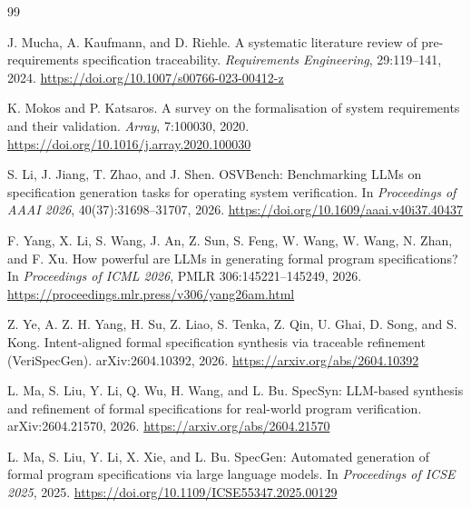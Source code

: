 
\begin{thebibliography}{99}

J. Mucha, A. Kaufmann, and D. Riehle.
\newblock A systematic literature review of pre-requirements specification traceability.
\newblock \emph{Requirements Engineering}, 29:119--141, 2024.
\newblock \url{https://doi.org/10.1007/s00766-023-00412-z}

K. Mokos and P. Katsaros.
\newblock A survey on the formalisation of system requirements and their validation.
\newblock \emph{Array}, 7:100030, 2020.
\newblock \url{https://doi.org/10.1016/j.array.2020.100030}

S. Li, J. Jiang, T. Zhao, and J. Shen.
\newblock OSVBench: Benchmarking LLMs on specification generation tasks for operating
system verification.
\newblock In \emph{Proceedings of AAAI 2026}, 40(37):31698--31707, 2026.
\newblock \url{https://doi.org/10.1609/aaai.v40i37.40437}

F. Yang, X. Li, S. Wang, J. An, Z. Sun, S. Feng, W. Wang, W. Wang, N. Zhan, and F. Xu.
\newblock How powerful are LLMs in generating formal program specifications?
\newblock In \emph{Proceedings of ICML 2026}, PMLR 306:145221--145249, 2026.
\newblock \url{https://proceedings.mlr.press/v306/yang26am.html}

Z. Ye, A. Z. H. Yang, H. Su, Z. Liao, S. Tenka, Z. Qin, U. Ghai, D. Song, and S. Kong.
\newblock Intent-aligned formal specification synthesis via traceable refinement
(VeriSpecGen).
\newblock arXiv:2604.10392, 2026.
\newblock \url{https://arxiv.org/abs/2604.10392}

L. Ma, S. Liu, Y. Li, Q. Wu, H. Wang, and L. Bu.
\newblock SpecSyn: LLM-based synthesis and refinement of formal specifications for
real-world program verification.
\newblock arXiv:2604.21570, 2026.
\newblock \url{https://arxiv.org/abs/2604.21570}

L. Ma, S. Liu, Y. Li, X. Xie, and L. Bu.
\newblock SpecGen: Automated generation of formal program specifications via large
language models.
\newblock In \emph{Proceedings of ICSE 2025}, 2025.
\newblock \url{https://doi.org/10.1109/ICSE55347.2025.00129}


\end{thebibliography}

